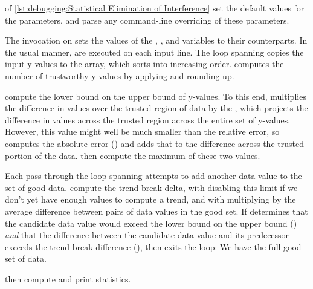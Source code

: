 \begin{fcvref}
 of
\cref{lst:debugging:Statistical Elimination of Interference}
set the default values for the parameters, and
 parse
any command-line overriding of these parameters.
\end{fcvref}
\begin{fcvref}
The  invocation on  sets the values of the
, , and  variables to their
 counterparts.
In the usual  manner,
 are executed on each input
line.
The loop spanning  copies
the input y-values to the
 array, which  sorts into increasing order.
 computes the number of trustworthy y-values
by applying  and rounding up.

 compute the 
lower bound on the upper bound of y-values.
To this end,  multiplies the difference in values over
the trusted region of data by the , which projects the
difference in values across the trusted region across the entire
set of y-values.
However, this value might well be much smaller than the relative error,
so  computes the absolute error ()
and adds
that to the difference  across the trusted portion of the data.
 then compute the maximum of
these two values.

Each pass through the loop spanning 
attempts to add another
data value to the set of good data.
 compute the trend-break delta,
with  disabling this
limit if we don't yet have enough values to compute a trend,
and with  multiplying  by the average
difference between pairs of data values in the good set.
If  determines that the candidate data value would exceed the
lower bound on the upper bound () \emph{and}
that the difference between the candidate data value
and its predecessor exceeds the trend-break difference (),
then  exits the loop: We have the full good set of data.

 then compute and print
statistics.
\end{fcvref}

